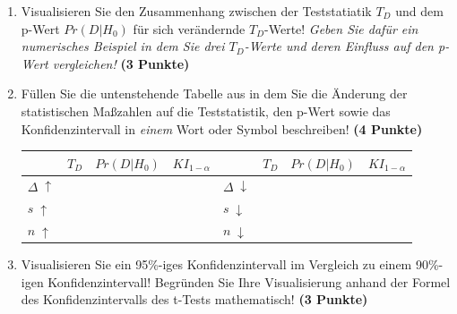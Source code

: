 \documentclass[a4paper, 9pt]{scrartcl}\usepackage[]{graphicx}\usepackage[]{xcolor}
\begin{document}
\begin{enumerate}
\item Visualisieren Sie den Zusammenhang zwischen der Teststatiatik
  $T_{D}$ und dem p-Wert $Pr(D|H_0)$ f{\"u}r sich ver{\"a}ndernde $T_{D}$-Werte!
  \textit{Geben Sie daf{\"u}r ein numerisches Beispiel in dem Sie drei
    $T_{D}$-Werte und deren Einfluss auf den p-Wert vergleichen!}
  \textbf{(3 Punkte)}  
\item  F{\"u}llen Sie die untenstehende Tabelle aus in dem Sie die {\"A}nderung der
  statistischen Ma{\ss}zahlen auf die Teststatistik, den p-Wert sowie das
  Konfidenzintervall in \textit{einem} Wort oder Symbol beschreiben! \textbf{(4 Punkte)}
\begin{center}
  \large
  \begin{tabular}[c]{l|c|c|c|l|c|c|c}
    & $T_{D}$ & $Pr(D|H_0)$ & $KI_{1-\alpha}$ & & $T_{D}$ & $Pr(D|H_0)$ & $KI_{1-\alpha}$\strut\\ 
    \hline
    \textbf{$\Delta\; \uparrow$} & \hspace{1.8cm} & \hspace{1.8cm}  & \hspace{1.8cm} & \textbf{
                                                          $\Delta\; \downarrow$} &
                                                                          \hspace{1.8cm} & \hspace{1.8cm}  & \hspace{1.8cm}\strut\\
    \hline
        \textbf{$s\; \uparrow$} & \hspace{1.8cm} & \hspace{1.8cm}  & \hspace{1.8cm} & \textbf{
                                                          $s\; \downarrow$} &
                                                                          \hspace{1.8cm}
                                                & \hspace{1.8cm}  & \hspace{1.8cm}\strut\\
    \hline
        \textbf{$n\; \uparrow$} & \hspace{1.8cm} & \hspace{1.8cm}  & \hspace{1.8cm} & \textbf{
                                                          $n\; \downarrow$} &
                                                                          \hspace{1.8cm}
                                                & \hspace{1.8cm}  & \hspace{1.8cm}\strut\\
    \hline
  \end{tabular}
\end{center}
\item Visualisieren Sie ein 95\%-iges Konfidenzintervall im Vergleich
  zu einem 90\%-igen Konfidenzintervall! Begr{\"u}nden Sie Ihre Visualisierung anhand der Formel
  des Konfidenzintervalls des t-Tests mathematisch! \textbf{(3 Punkte)} 
\end{enumerate} 
\end{document}
